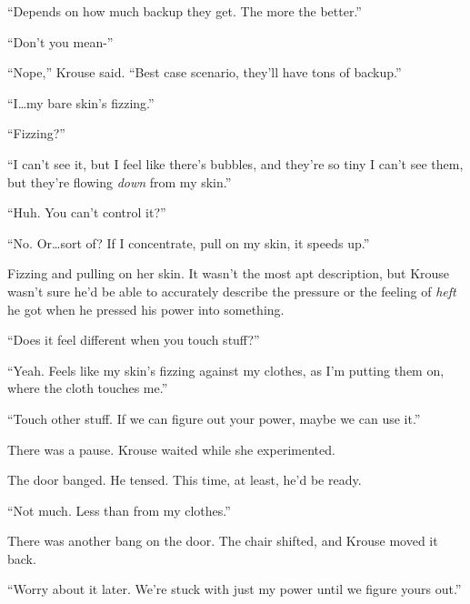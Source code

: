 ``Depends on how much backup they get.  The more the better.''



``Don't you mean-''



``Nope,'' Krouse said.  ``Best case scenario, they'll have tons of backup.''



``I\ldots my bare skin's fizzing.''



``Fizzing?''



``I can't see it, but I feel like there's bubbles, and they're so tiny I can't see them, but they're flowing \emph{down} from my skin.''



``Huh.  You can't control it?''



``No.  Or\ldots sort of?  If I concentrate, pull on my skin, it speeds up.''



Fizzing and pulling on her skin.  It wasn't the most apt description, but Krouse wasn't sure he'd be able to accurately describe the pressure or the feeling of \emph{heft} he got when he pressed his power into something.



``Does it feel different when you touch stuff?''



``Yeah.  Feels like my skin's fizzing against my clothes, as I'm putting them on, where the cloth touches me.''



``Touch other stuff.  If we can figure out your power, maybe we can use it.''



There was a pause.  Krouse waited while she experimented.



The door banged.  He tensed.  This time, at least, he'd be ready.



``Not much.  Less than from my clothes.''



There was another bang on the door.  The chair shifted, and Krouse moved it back.



``Worry about it later.  We're stuck with just my power until we figure yours out.''



